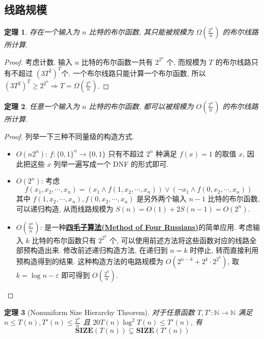 \documentclass[8pt]{article}
\theoremstyle{compact}
\newtheorem{theorem}{定理}[section]
\def\obj#1{\textbf{\uline{#1}}}
\def\le{\leqslant}
\def\ge{\geqslant}
\def\SIZE{\textbf{SIZE}}
\begin{document}
\subsection{线路规模}
\begin{theorem}
	存在一个输入为 $n$ 比特的布尔函数, 其只能被规模为 $\Omega\left(\frac{2^n}{n}\right)$ 的布尔线路所计算.
\end{theorem}
\begin{proof}
	考虑计数. 输入 $n$ 比特的布尔函数一共有 $2^{2^n}$ 个, 而规模为 $T$ 的布尔线路只有不超过 $\left(3T^2\right)^T$个. 一个布尔线路只能计算一个布尔函数, 所以 $(3T^2)^T \ge 2^{2^n} \Rightarrow T = \Omega(\frac{2^n}{n})$.
\end{proof}
\begin{theorem}
	任意一个输入为 $n$ 比特的布尔函数, 都可以被规模为 $O\left(\frac{2^n}{n}\right)$ 的布尔线路所计算.
\end{theorem}
\begin{proof}
	列举一下三种不同量级的构造方式.
	\begin{itemize}
		\item $O(n2^n)$: $f: \{0, 1\}^n \to \{0, 1\}$ 只有不超过 $2^n$ 种满足 $f(x) = 1$ 的取值 $x$, 因此把这些 $x$ 列举一遍写成一个 DNF 的形式即可.
		\item $O(2^n)$: 考虑 $$f(x_1, x_2, \cdots, x_n) = (x_1 \wedge f(1, x_2, \cdots, x_n)) \vee (\lnot x_1 \wedge f(0, x_2, \cdots, x_n))$$ 其中 $f(1, x_2, \cdots, x_n), f(0, x_2, \cdots, x_n)$ 是另外两个输入 $n - 1$ 比特的布尔函数, 可以递归构造, 从而线路规模为 $S(n) = O(1) + 2S(n - 1) = O(2^n)$.
		\item $O\left(\frac{2^n}{n}\right)$: 是一种\obj{四毛子算法(Method of Four Russians)}的简单应用. 考虑输入 $k$ 比特的布尔函数只有 $2^{2^k}$ 个, 可以使用前述方法将这些函数对应的线路全部预构造出来. 修改前述递归构造方法, 在递归到 $n = k$ 时停止, 转而直接利用预构造得到的结果. 这种构造方法的电路规模为 $O(2^{n - k} + 2^k \cdot 2^{2^k})$, 取 $k = \log n - \varepsilon$ 即可得到 $O\left(\frac{2^n}{n}\right)$.
	\end{itemize}
\end{proof}
\begin{theorem}[Nonuniform Size Hierarchy Theorem]
	对于任意函数 $T, T': \mathbb N \to \mathbb N$ 满足 $n \le T(n), T'(n) \le \frac{2^n}{n}$ 且 $20T(n)\log^2 T(n) \le T'(n)$, 有 $$\SIZE(T(n)) \subsetneq \SIZE(T'(n))$$
\end{theorem}
\end{document}
